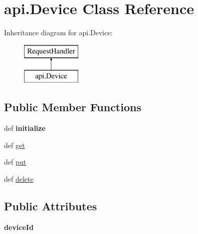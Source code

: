 \hypertarget{classapi_1_1_device}{\section{api.\-Device Class Reference}
\label{classapi_1_1_device}
}
Inheritance diagram for api.\-Device\-:\begin{figure}[H]
\begin{center}
\leavevmode
\includegraphics[height=2.000000cm]{classapi_1_1_device}
\end{center}
\end{figure}
\subsection*{Public Member Functions}
\begin{DoxyCompactItemize}
\item 
\hypertarget{classapi_1_1_device_abe43b29a0471c001944bb1634ead3165}{def {\bfseries initialize}}\label{classapi_1_1_device_abe43b29a0471c001944bb1634ead3165}

\item 
def \hyperlink{classapi_1_1_device_aab84744b823a1e3f44700c9ba50d5051}{get}
\item 
def \hyperlink{classapi_1_1_device_ae051140ce5b14440b74a6634c27ee4c0}{put}
\item 
def \hyperlink{classapi_1_1_device_aa1b4c05ad4a3331e80331754055c0ec9}{delete}
\end{DoxyCompactItemize}
\subsection*{Public Attributes}
\begin{DoxyCompactItemize}
\item 
\hypertarget{classapi_1_1_device_a0190a4c54d0998cd83368e9b99b9cfdf}{{\bfseries device\-Id}}\label{classapi_1_1_device_a0190a4c54d0998cd83368e9b99b9cfdf}

\end{DoxyCompactItemize}


